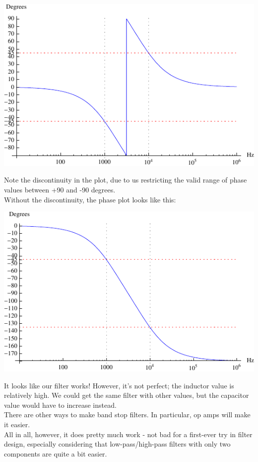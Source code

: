 \documentclass[12pt,a4paper]{report}
\begin{document}
\includegraphics[scale=1.4]{Graphics/bsf_phase_plot}

Note the discontinuity in the plot, due to us restricting the valid range of phase values between +90 and -90 degrees.\\
Without the discontinuity, the phase plot looks like this:

\includegraphics[scale=1.4]{Graphics/bsf_phase_plot_no_disc}

It looks like our filter works! However, it's not perfect; the inductor value is relatively high. We could get the same filter with other values, but the capacitor value would have to increase instead.\\
There are other ways to make band stop filters. In particular, op amps will make it easier.\\
All in all, however, it does pretty much work - not bad for a first-ever try in filter design, especially  considering that low-pass/high-pass filters with only two components are quite a bit easier.
\end{document}
